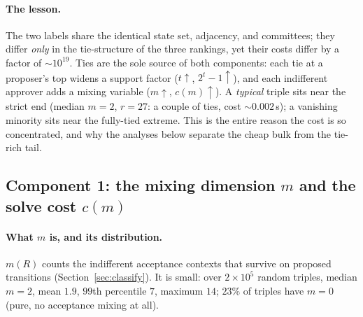 \documentclass[11pt]{article}
\begin{document}
\paragraph{The lesson.} The two labels share the identical state set, adjacency, and
committees; they differ \emph{only} in the tie-structure of the three rankings, yet
their costs differ by a factor of $\sim10^{19}$. Ties are the sole source of both
components: each tie at a proposer's top widens a support factor ($t\!\uparrow$,
$2^t-1\!\uparrow$), and each indifferent approver adds a mixing variable
($m\!\uparrow$, $c(m)\!\uparrow$). A \emph{typical} triple sits near the strict end
(median $m=2$, $r=27$: a couple of ties, cost $\sim$$0.002$\,s); a vanishing minority
sits near the fully-tied extreme. This is the entire reason the cost is so
concentrated, and why the analyses below separate the cheap bulk from the tie-rich
tail.

\subsection{Component 1: the mixing dimension \texorpdfstring{$m$}{m} and the solve cost \texorpdfstring{$c(m)$}{c(m)}}
\label{sec:comp-m}
\paragraph{What $m$ is, and its distribution.} $m(R)$ counts the indifferent
acceptance contexts that survive on proposed transitions (Section~\ref{sec:classify}).
It is small: over $2\times10^5$ random triples, median $m=2$, mean $1.9$, $99$th
percentile $7$, maximum $14$; $23\%$ of triples have $m=0$ (pure, no acceptance
mixing at all).
\end{document}

